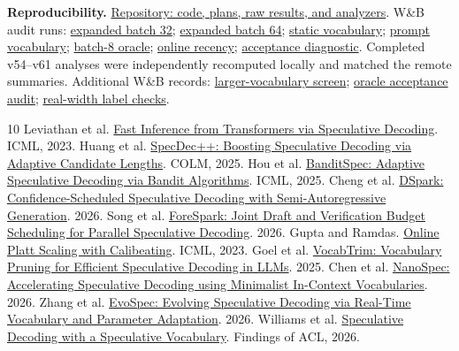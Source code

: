 \documentclass[10pt]{article}
\begin{document}
\textbf{Reproducibility.} \href{https://github.com/angelinaquan/adaptive-verification-for-speculative-decoding}{Repository: code, plans, raw results, and analyzers}. W\&B audit runs: \href{https://wandb.ai/aquan-world-model/18657-speculative-pilot/runs/vxw4i4v4}{expanded batch 32}; \href{https://wandb.ai/aquan-world-model/18657-speculative-pilot/runs/az4k5l1i}{expanded batch 64}; \href{https://wandb.ai/aquan-world-model/18657-speculative-pilot/runs/dij1tz6j}{static vocabulary}; \href{https://wandb.ai/aquan-world-model/18657-speculative-pilot/runs/qpv8opau}{prompt vocabulary}; \href{https://wandb.ai/aquan-world-model/18657-speculative-pilot/runs/amrk97ic}{batch-8 oracle}; \href{https://wandb.ai/aquan-world-model/18657-speculative-pilot/runs/xp0unh2g}{online recency}; \href{https://wandb.ai/aquan-world-model/18657-speculative-pilot/runs/gkx5aht9}{acceptance diagnostic}. Completed v54--v61 analyses were independently recomputed locally and matched the remote summaries. Additional W\&B records: \href{https://wandb.ai/aquan-world-model/18657-speculative-pilot/runs/7v6j6ei1}{larger-vocabulary screen}; \href{https://wandb.ai/aquan-world-model/18657-speculative-pilot/runs/60d426bm}{oracle acceptance audit}; \href{https://wandb.ai/aquan-world-model/18657-speculative-pilot/runs/16e7ipqo}{real-width label checks}.
\newpage
\begin{thebibliography}{10}\small
{} Leviathan et al. \href{https://arxiv.org/abs/2211.17192}{Fast Inference from Transformers via Speculative Decoding}. ICML, 2023.
 Huang et al. \href{https://arxiv.org/abs/2405.19715}{SpecDec++: Boosting Speculative Decoding via Adaptive Candidate Lengths}. COLM, 2025.
 Hou et al. \href{https://proceedings.mlr.press/v267/hou25h.html}{BanditSpec: Adaptive Speculative Decoding via Bandit Algorithms}. ICML, 2025.
 Cheng et al. \href{https://arxiv.org/abs/2607.05147}{DSpark: Confidence-Scheduled Speculative Decoding with Semi-Autoregressive Generation}. 2026.
 Song et al. \href{https://arxiv.org/abs/2611.13442}{ForeSpark: Joint Draft and Verification Budget Scheduling for Parallel Speculative Decoding}. 2026.
 Gupta and Ramdas. \href{https://proceedings.mlr.press/v202/gupta23c.html}{Online Platt Scaling with Calibeating}. ICML, 2023.
 Goel et al. \href{https://arxiv.org/abs/2506.22694}{VocabTrim: Vocabulary Pruning for Efficient Speculative Decoding in LLMs}. 2025.
 Chen et al. \href{https://arxiv.org/abs/2605.26444}{NanoSpec: Accelerating Speculative Decoding using Minimalist In-Context Vocabularies}. 2026.
 Zhang et al. \href{https://arxiv.org/abs/2605.27390}{EvoSpec: Evolving Speculative Decoding via Real-Time Vocabulary and Parameter Adaptation}. 2026.
 Williams et al. \href{https://arxiv.org/abs/2602.13836}{Speculative Decoding with a Speculative Vocabulary}. Findings of ACL, 2026.
\end{thebibliography}
\end{document}
